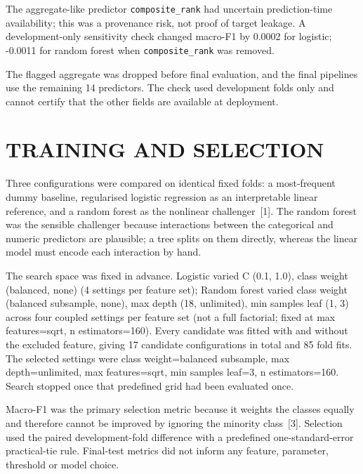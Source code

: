 \documentclass[10pt,a4paper,twocolumn]{article}
\begin{document}
The aggregate-like predictor \texttt{composite\_rank} had uncertain prediction-time availability; this was a provenance risk, not proof of target leakage. A development-only sensitivity check changed macro-F1 by 0.0002 for logistic; -0.0011 for random forest when \texttt{composite\_rank} was removed.

The flagged aggregate was dropped before final evaluation, and the final pipelines
use the remaining 14 predictors. The check used development folds only and
cannot certify that the other fields are available at deployment.

\section*{TRAINING AND SELECTION}
Three configurations were compared on identical fixed folds: a
most-frequent dummy baseline, regularised logistic regression as an
interpretable linear reference, and a random forest as the nonlinear
challenger~[1]. The random forest was the sensible challenger because interactions
between the categorical and numeric predictors are plausible; a tree splits on them
directly, whereas the linear model must encode each interaction by hand.

The search space was fixed in advance. Logistic varied C (0.1, 1.0), class weight (balanced, none) (4 settings per feature set); Random forest varied class weight (balanced subsample, none), max depth (18, unlimited), min samples leaf (1, 3) across four coupled settings per feature set (not a full factorial; fixed at max features=sqrt, n estimators=160). Every candidate was fitted
with and without the excluded feature, giving 17 candidate configurations in
total and 85 fold fits. The selected settings were class weight=balanced subsample, max depth=unlimited, max features=sqrt, min samples leaf=3, n estimators=160. Search
stopped once that predefined grid had been evaluated once.

Macro-F1 was the primary selection metric because it weights the classes
equally and therefore cannot be improved by ignoring the minority
class~[3]. Selection used the paired development-fold difference with a
predefined one-standard-error practical-tie rule. Final-test metrics did not
inform any feature, parameter, threshold or model choice.
\end{document}
